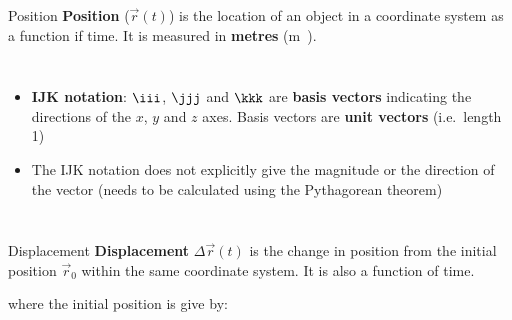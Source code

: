\documentclass[12pt,compress,aspectratio=169,dvipsnames]{beamer}
\begin{document}
\begin{frame}{Position}
  \textbf{Position} ($\vec r(t)$) is the location of an object in a coordinate
  system as a function if time. It is measured in \textbf{metres}
  (\si\metre).
  \begin{columns}

    \begin{itemize}
    \item\vspace{-.1in}\textbf{IJK notation}: $\iii$, $\jjj$ and $\kkk$ are
      \textbf{basis vectors} indicating the directions of the $x$, $y$ and $z$
      axes. Basis vectors are \textbf{unit vectors} (i.e.\ length 1)
    \item The IJK notation does not explicitly give the magnitude or the
      direction of the vector (needs to be calculated using the Pythagorean
      theorem)
    \end{itemize}

  \end{columns}
\end{frame}



\begin{frame}{Displacement}
  \textbf{Displacement} $\Delta\vec r(t)$ is the change in position from the
  initial position $\vec r_0$ within the same coordinate system. It is also a
  function of time.


  where the initial position is give by:

  
\end{frame}
\end{document}
